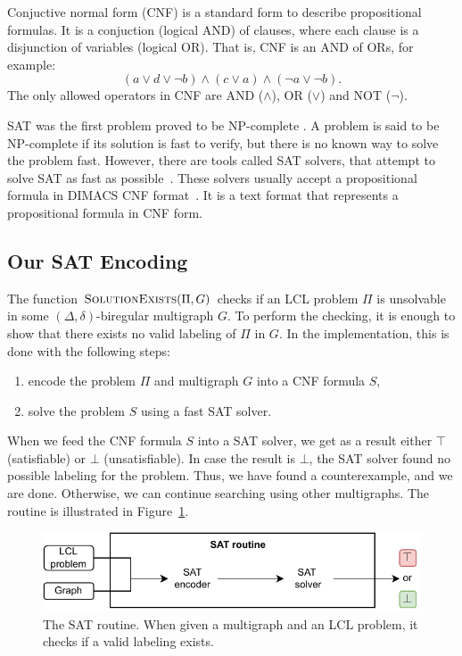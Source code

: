 Conjuctive normal form (CNF) is a standard form to describe propositional formulas.
It is a conjuction (logical AND) of clauses, where each clause is a disjunction of variables (logical OR).
That is, CNF is an AND of ORs, for example:
$$(a \lor d \lor \neg b)\land (c \lor a) \land (\neg a \lor  \neg b).$$
The only allowed operators in CNF are AND ($\land$), OR ($\lor$) and NOT ($\neg$).

SAT was the first problem proved to be NP-complete \cite{DBLP:conf/stoc/Cook71}.
A problem is said to be NP-complete if its solution is fast to verify, but there is no known way to solve the problem fast.
However, there are tools called SAT solvers, that attempt to solve SAT as fast as possible~\cite{TheInternationalSATCompetitionWebPage}.
These solvers usually accept a propositional formula in DIMACS CNF format~\cite{DIMACS:CNF}.
It is a text format that represents a propositional formula in CNF form.

\subsection{Our SAT Encoding} \label{sec:implementation:our_sat}


The function $\textsc{SolutionExists}(\Pi, G)$ checks if an LCL problem $\Pi$ is unsolvable in some $(\Delta, \delta)$-biregular multigraph $G$.
To perform the checking, it is enough to show that there exists no valid labeling of $\Pi$ in $G$.
In the implementation, this is done with the following steps:
\begin{enumerate}
    \item encode the problem $\Pi$ and multigraph $G$ into a CNF formula $S$,
    \item solve the problem $S$ using a fast SAT solver.
\end{enumerate}
When we feed the CNF formula $S$ into a SAT solver, we get as a result either $\top$ (satisfiable) or $\bot$ (unsatisfiable).
In case the result is $\bot$, the SAT solver found no possible labeling for the problem.
Thus, we have found a counterexample, and we are done.
Otherwise, we can continue searching using other multigraphs.
The routine is illustrated in Figure~\ref{fig:implementation:1}.

\begin{figure}[H]
\centering
\includegraphics[]{diagrams/implementation_idea_diagram2a.pdf}
\caption{The SAT routine. When given a multigraph and an LCL problem, it checks if a valid labeling exists.}
\label{fig:implementation:1}
\end{figure}

